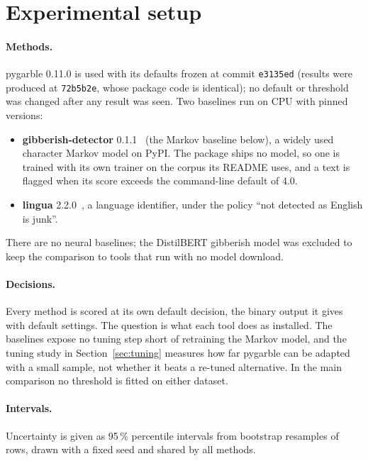 \documentclass[10pt,twocolumn]{article}
\newcommand{\code}[1]{\texttt{#1}}
\begin{document}
\section{Experimental setup}
\label{sec:setup}

\paragraph{Methods.} pygarble 0.11.0 is used with its defaults frozen at
commit \code{e3135ed} (results were produced at \code{72b5b2e}, whose
package code is identical); no default or threshold was changed after any
result was seen. Two baselines run on CPU with pinned versions:
\begin{itemize}\setlength{\itemsep}{1pt}
\item \textbf{gibberish-detector} 0.1.1~\citep{gibberishdetector} (the
  Markov baseline below), a widely used character Markov model on PyPI.
  The package ships no model, so one is trained with its own
  trainer on the corpus its README uses, and a text is flagged when its
  score exceeds the command-line default of 4.0.
\item \textbf{lingua} 2.2.0~\citep{lingua}, a language identifier, under
  the policy ``not detected as English is junk''.
\end{itemize}
There are no neural baselines; the DistilBERT gibberish model was
excluded to keep the comparison to tools that run with no model download.

\paragraph{Decisions.} Every method is scored at its own default
decision, the binary output it gives with default settings. The
question is what each tool does as installed. The baselines expose no
tuning step short of retraining the Markov model, and the tuning study in
Section~\ref{sec:tuning} measures how far pygarble can be adapted with a
small sample, not whether it beats a re-tuned alternative. In the main
comparison no threshold is fitted on either dataset.

\paragraph{Intervals.} Uncertainty is given as 95\,\% percentile
intervals from \resamples{} bootstrap resamples of rows, drawn with a
fixed seed and shared by all methods.
\end{document}
